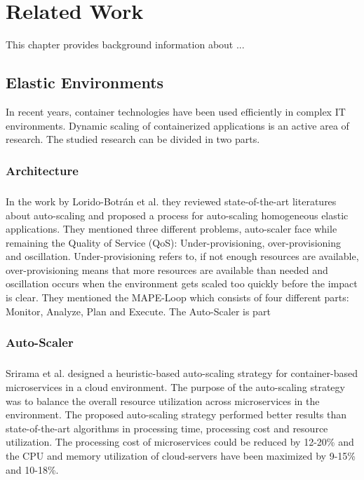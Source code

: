 \chapter{Related Work}
\label{sec:related}
%

This chapter provides background information about ...


\section{Elastic Environments}
In recent years, container technologies have been used efficiently in complex IT environments. Dynamic scaling of containerized applications is an active area of research. The studied research can be divided in two parts. 


\subsection{Architecture}
\paragraph{} In the work by Lorido-Botrán et al.  they reviewed state-of-the-art literatures about auto-scaling and proposed a process for auto-scaling homogeneous elastic applications. They mentioned three different problems, auto-scaler face while remaining the Quality of Service (QoS): Under-provisioning, over-provisioning and oscillation. Under-provisioning refers to, if not enough resources are available, over-provisioning means that more resources are available than needed and oscillation occurs when the environment gets scaled too quickly before the impact is clear. They mentioned the MAPE-Loop which consists of four different parts: Monitor, Analyze, Plan and Execute.  The Auto-Scaler is part 


\subsection{Auto-Scaler}
\paragraph{}Srirama et al. \citep{Srirama2020AppDeplyCont} designed a heuristic-based auto-scaling strategy for container-based microservices in a cloud environment. The purpose of the auto-scaling strategy was to balance the overall resource utilization across microservices in the environment.
The proposed auto-scaling strategy performed better results than state-of-the-art algorithms in processing time, processing cost and resource utilization. The processing cost of microservices could be reduced by 12-20\% and the CPU and memory utilization of cloud-servers have been maximized by 9-15\% and 10-18\%.


